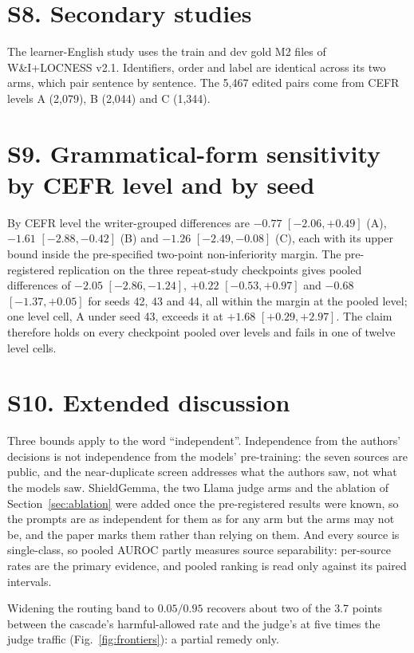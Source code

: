 \documentclass[journal]{IEEEtran}
\begin{document}
\section*{S8. Secondary studies}

The learner-English study uses the train and dev gold M2 files of
W\&I+LOCNESS v2.1. Identifiers, order and label are identical across its two
arms, which pair sentence by sentence. The 5{,}467 edited pairs come from CEFR
levels A (2{,}079), B (2{,}044) and C (1{,}344).

\section*{S9. Grammatical-form sensitivity by CEFR level and by seed}

By CEFR level the writer-grouped differences are $-0.77$ $[-2.06, +0.49]$ (A),
$-1.61$ $[-2.88, -0.42]$ (B) and $-1.26$ $[-2.49, -0.08]$ (C), each with its
upper bound inside the pre-specified two-point non-inferiority margin. The
pre-registered replication on the three repeat-study checkpoints gives pooled
differences of $-2.05$ $[-2.86, -1.24]$, $+0.22$ $[-0.53, +0.97]$ and $-0.68$
$[-1.37, +0.05]$ for seeds 42, 43 and 44, all within the margin at the pooled
level; one level cell, A under seed 43, exceeds it at $+1.68$ $[+0.29, +2.97]$.
The claim therefore holds on every checkpoint pooled over levels and fails in
one of twelve level cells.

\section*{S10. Extended discussion}

Three bounds apply to the word ``independent''. Independence from the authors'
decisions is not independence from the models' pre-training: the seven sources
are public, and the near-duplicate screen addresses what the authors saw, not
what the models saw. ShieldGemma, the two Llama judge arms and the ablation of
Section~\ref{sec:ablation} were added once the pre-registered results were
known, so the prompts are as independent for them as for any arm but the arms
may not be, and the paper marks them rather than relying on them. And every
source is single-class, so pooled AUROC partly measures source separability:
per-source rates are the primary evidence, and pooled ranking is read only
against its paired intervals.

Widening the routing band to $0.05/0.95$ recovers about two of the \num{3.7}
points between the cascade's harmful-allowed rate and the judge's at five times
the judge traffic (Fig.~\ref{fig:frontiers}): a partial remedy only.
\end{document}
